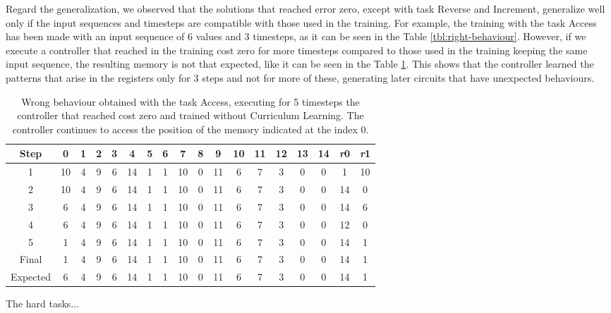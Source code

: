 Regard the generalization, we observed that the solutions that reached error zero, except with task Reverse and Increment, generalize well only if the input sequences and timesteps are compatible with those used in the training. For example, the training with the task Access has been made with an input sequence of 6 values and 3 timesteps, as it can be seen in the Table \ref{tbl:right-behaviour}. However, if we execute a controller that reached in the training cost zero for more timesteps compared to those used in the training keeping the same input sequence, the resulting memory is not that expected, like it can be seen in the Table \ref{tbl:wrong-behaviour}. This shows that the controller learned the patterns that arise in the registers only for 3 steps and not for more of these, generating later circuits that have unexpected behaviours.\newline
\begin{table}[t]
	\centering
	\begin{tabular}{c|ccccccccccccccc|cc}
		\rowcolor{Gray}\textbf{Step} & 0 & 1 & 2 & 3 & 4 & 5 & 6 & 7 & 8 & 9 & 10 & 11 & 12 & 13 & 14 & \textit{r}0 & \textit{r}1 \\ \hline 
1 & 10 & 4 & 9 & 6 & 14 & 1 & 1 & 10 & 0 & 11 & 6 & 7 & 3 & 0 & 0 & 1 & 10 \\ 
2 & 10 & 4 & 9 & 6 & 14 & 1 & 1 & 10 & 0 & 11 & 6 & 7 & 3 & 0 & 0 & 14 & 0 \\ 
3 & 6 & 4 & 9 & 6 & 14 & 1 & 1 & 10 & 0 & 11 & 6 & 7 & 3 & 0 & 0 & 14 & 6 \\ 
4 & 6 & 4 & 9 & 6 & 14 & 1 & 1 & 10 & 0 & 11 & 6 & 7 & 3 & 0 & 0 & 12 & 0 \\ 
5 & 1 & 4 & 9 & 6 & 14 & 1 & 1 & 10 & 0 & 11 & 6 & 7 & 3 & 0 & 0 & 14 & 1 \\ \hline 
\rowcolor{Gray}Final & 1 & 4 & 9 & 6 & 14 & 1 & 1 & 10 & 0 & 11 & 6 & 7 & 3 & 0 & 0 & 14 & 1 \\
\rowcolor{Gray}Expected & 6 & 4 & 9 & 6 & 14 & 1 & 1 & 10 & 0 & 11 & 6 & 7 & 3 & 0 & 0 & 14 & 1 \\
	\end{tabular}
	\label{tbl:wrong-behaviour}
	\caption{Wrong behaviour obtained with the task Access, executing for 5 timesteps the controller that reached cost zero and trained without Curriculum Learning. The controller continues to access the position of the memory indicated at the index 0.}
\end{table}
The hard tasks...\newline

